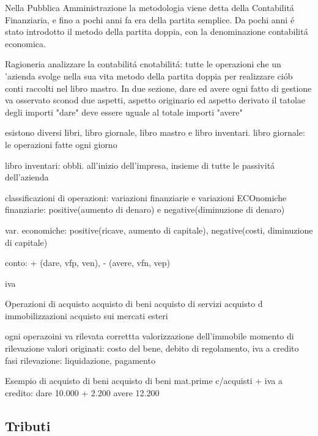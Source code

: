 \documentclass{article}
\begin{document}
Nella Pubblica Amministrazione la metodologia viene detta della Contabilit\'a Finanziaria, e fino a pochi anni fa era della partita semplice. Da pochi anni \'e stato introdotto il metodo della partita doppia, con la denominazione contabilit\'a economica.

Ragioneria analizzare la contabilit\'a 
cnotabilit\'a: tutte le operazioni che un 'azienda svolge nella sua vita
metodo della partita doppia per realizzare ci\'ob
conti raccolti nel libro mastro. In due sezione, dare ed avere
ogni fatto di gestione va osservato sconod due aspetti, aspetto originario ed aspetto derivato
il tatolae degli importi "dare" deve essere uguale al totale importi "avere"

esistono diversi libri, libro giornale, libro mastro e libro inventari.
libro giornale: le operazioni fatte ogni giorno

libro inventari: obbli. all'inizio dell'impresa, insieme di tutte le passivit\'a dell'azienda

classificazioni di operazioni:
variazioni finanziarie e variazioni ECOnomiche
finanziarie: positive(aumento di denaro) e negative(diminuzione di denaro)

var. economiche: positive(ricave, aumento di capitale), negative(costi, diminuzione di capitale)

conto: + (dare, vfp, ven), - (avere, vfn, vep)

iva

Operazioni di acquisto
acquisto di beni
acquisto di servizi
acquisto d immobilizzazioni
acquisto sui mercati esteri

ogni operazoini va rilevata
correttta valorizzazione dell'immobile
momento di rilevazione
valori originati: costo del bene, debito di regolamento, iva a credito
fasi rilevazione: liquidazione, pagamento

Esempio di acquisto di beni
acquisto di beni
mat.prime c/acquisti +  iva a credito: dare 10.000 + 2.200
avere 12.200



\subsection{Tributi}
\end{document}
